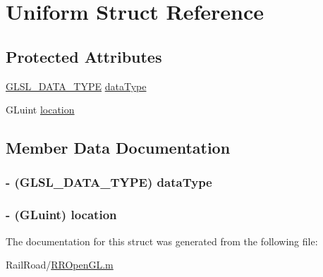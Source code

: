 \hypertarget{struct_uniform}{\section{Uniform Struct Reference}
\label{struct_uniform}
}
\subsection*{Protected Attributes}
\begin{DoxyCompactItemize}
\item 
\hyperlink{_r_r_open_g_l_8h_a4e1ed336ae3eb58557625c81703dc366}{G\-L\-S\-L\-\_\-\-D\-A\-T\-A\-\_\-\-T\-Y\-P\-E} \hyperlink{struct_uniform_a4cc34c534e55fde79aede504e3defa54}{data\-Type}
\item 
G\-Luint \hyperlink{struct_uniform_adcf877fd7a5f4cb6fca1427b9e59bd9a}{location}
\end{DoxyCompactItemize}


\subsection{Member Data Documentation}
\hypertarget{struct_uniform_a4cc34c534e55fde79aede504e3defa54}{
\subsubsection[{data\-Type}]{\setlength{\rightskip}{0pt plus 5cm}-\/ ({\bf G\-L\-S\-L\-\_\-\-D\-A\-T\-A\-\_\-\-T\-Y\-P\-E}) data\-Type\hspace{0.3cm}{\ttfamily [protected]}}}\label{struct_uniform_a4cc34c534e55fde79aede504e3defa54}
\hypertarget{struct_uniform_adcf877fd7a5f4cb6fca1427b9e59bd9a}{
\subsubsection[{location}]{\setlength{\rightskip}{0pt plus 5cm}-\/ (G\-Luint) location\hspace{0.3cm}{\ttfamily [protected]}}}\label{struct_uniform_adcf877fd7a5f4cb6fca1427b9e59bd9a}


The documentation for this struct was generated from the following file\-:\begin{DoxyCompactItemize}
\item 
Rail\-Road/\hyperlink{_r_r_open_g_l_8m}{R\-R\-Open\-G\-L.\-m}\end{DoxyCompactItemize}
